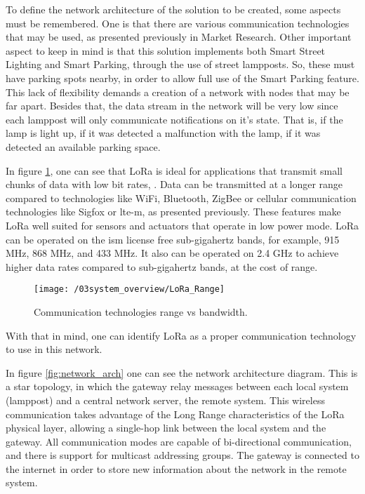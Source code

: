 To define the network architecture of the solution to be created, some aspects must be remembered. One is that there are various communication technologies that may be used, as presented previously in Market Research. Other important aspect to keep in mind is that this solution implements both Smart Street Lighting and Smart Parking, through the use of street lampposts. So, these must have parking spots nearby, in order to allow full use of the Smart Parking feature. This lack of flexibility demands a creation of a network with nodes that may be far apart. Besides that, the data stream in the network will be very low since each lamppost will only communicate notifications on it's state. That is, if the lamp is light up, if it was detected a malfunction with the lamp, if it was detected an available parking space. 

In figure \ref{fig:LoRa_Range}, one can see that LoRa is ideal for applications that transmit small chunks of data with low bit rates, . Data can be transmitted at a longer range compared to technologies like WiFi, Bluetooth, ZigBee or cellular communication technologies like Sigfox or \ac{lte-m}, as presented previously. These features make LoRa well suited for sensors and actuators that operate in low power mode. LoRa can be operated on the \ac{ism} license free sub-gigahertz bands, for example, 915 MHz, 868 MHz, and 433 MHz. It also can be operated on 2.4 GHz to achieve higher data rates compared to sub-gigahertz bands, at the cost of range. \cite{lora_lorawan}

\clearpage
\begin{figure}[ht]
	\centering
	\texttt{[image: /03system\_overview/LoRa\_Range]}
	\caption{Communication technologies range vs bandwidth.}
	\label{fig:LoRa_Range}
\end{figure}

With that in mind, one can identify LoRa as a proper communication technology to use in this network. 

In figure \ref{fig:network_arch} one can see the network architecture diagram. This is a star topology, in which the gateway relay messages between each local system (lamppost) and a central network server, the remote system. This wireless communication takes advantage of the Long Range characteristics of the LoRa physical layer, allowing a single-hop link between the local system and the gateway. All communication modes are capable of bi-directional communication, and there is support for multicast addressing groups. The gateway is connected to the internet in order to store new information about the network in the remote system.


